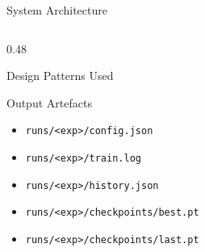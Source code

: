 \documentclass[aspectratio=169, 10pt]{beamer}
\begin{document}
\begin{frame}{System Architecture}
\begin{columns}[T]
\begin{column}{0.48\textwidth}
\begin{block}{Design Patterns Used}
      \end{block}
      \begin{block}{Output Artefacts}
        \begin{itemize}
          \item \texttt{runs/<exp>/config.json}
          \item \texttt{runs/<exp>/train.log}
          \item \texttt{runs/<exp>/history.json}
          \item \texttt{runs/<exp>/checkpoints/best.pt}
          \item \texttt{runs/<exp>/checkpoints/last.pt}
        \end{itemize}
      \end{block}
    \end{column}
  \end{columns}
\end{frame}
\end{document}
